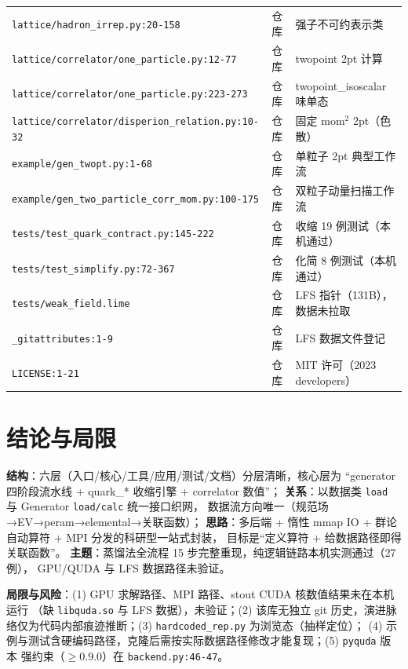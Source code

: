 \documentclass[UTF8]{ctexart}
\begin{document}
\begin{xltabular}{\textwidth}{llX}
\texttt{\nolinkurl{lattice/hadron_irrep.py:20-158}} & 仓库 & 强子不可约表示类 \\
\texttt{\nolinkurl{lattice/correlator/one_particle.py:12-77}} & 仓库 & twopoint 2pt 计算 \\
\texttt{\nolinkurl{lattice/correlator/one_particle.py:223-273}} & 仓库 & twopoint\_isoscalar 味单态 \\
\texttt{\nolinkurl{lattice/correlator/disperion_relation.py:10-32}} & 仓库 & 固定 mom$^2$ 2pt（色散） \\
\texttt{\nolinkurl{example/gen_twopt.py:1-68}} & 仓库 & 单粒子 2pt 典型工作流 \\
\texttt{\nolinkurl{example/gen_two_particle_corr_mom.py:100-175}} & 仓库 & 双粒子动量扫描工作流 \\
\texttt{\nolinkurl{tests/test_quark_contract.py:145-222}} & 仓库 & 收缩 19 例测试（本机通过） \\
\texttt{\nolinkurl{tests/test_simplify.py:72-367}} & 仓库 & 化简 8 例测试（本机通过） \\
\texttt{\nolinkurl{tests/weak_field.lime}} & 仓库 & LFS 指针（131B），数据未拉取 \\
\texttt{\nolinkurl{_gitattributes:1-9}} & 仓库 & LFS 数据文件登记 \\
\texttt{\nolinkurl{LICENSE:1-21}} & 仓库 & MIT 许可（2023 developers） \\
\bottomrule
\end{xltabular}

\section{结论与局限}
\begin{conclbox}
\textbf{结构}：六层（入口/核心/工具/应用/测试/文档）分层清晰，核心层为
``generator 四阶段流水线 + quark\_* 收缩引擎 + correlator 数值''；
\textbf{关系}：以数据类 \texttt{load} 与 Generator \texttt{load/calc} 统一接口织网，
数据流方向唯一（规范场→EV→peram→elemental→关联函数）；
\textbf{思路}：多后端 + 惰性 mmap IO + 群论自动算符 + MPI 分发的科研型一站式封装，
目标是``定义算符 + 给数据路径即得关联函数''。
\textbf{主题}：蒸馏法全流程 15 步完整重现，纯逻辑链路本机实测通过（27 例），
GPU/QUDA 与 LFS 数据路径未验证。
\end{conclbox}
\begin{warnbox}
\textbf{局限与风险}：(1) GPU 求解路径、MPI 路径、stout CUDA 核数值结果未在本机运行
（缺 \texttt{libquda.so} 与 LFS 数据），\textcolor{warn}{未验证}；(2) 该库无独立 git
历史，演进脉络仅为代码内部痕迹推断；(3) \texttt{hardcoded\_rep.py} 为浏览态（抽样定位）；
(4) 示例与测试含硬编码路径，克隆后需按实际数据路径修改才能复现；(5) \texttt{pyquda} 版本
强约束（$\ge$0.9.0）在 \texttt{backend.py:46-47}。
\end{warnbox}
\end{document}
